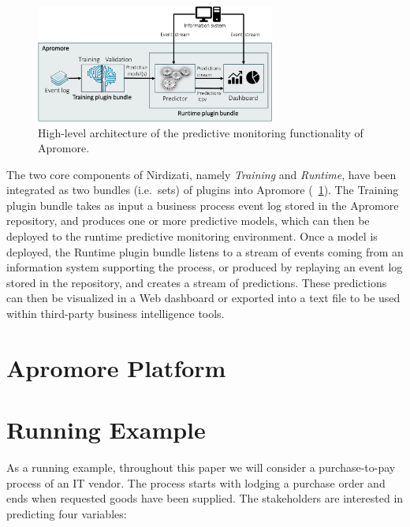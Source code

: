 \documentclass[runningheads,a4paper]{llncs}
\begin{document}
\begin{figure}[t]%
	\centering
	\includegraphics[width=0.7\textwidth]{img/nirdizati-overall.pdf}
	\caption{High-level architecture of the predictive monitoring functionality of Apromore.}
	\label{fig:nirdizati-overall}
\end{figure}

The two core components of Nirdizati, namely \textit{Training} and \textit{Runtime}, have been integrated as two bundles (i.e.\ sets) of plugins into Apromore (\figurename~\ref{fig:nirdizati-overall}). The Training plugin bundle takes as input a business process event log stored in the Apromore repository, and produces one or more predictive models, which can then be deployed to the runtime predictive monitoring environment. Once a model is deployed, the Runtime plugin bundle listens to a stream of events coming from an information system supporting the process, or produced by replaying an event log stored in the repository, and creates a stream of predictions. These predictions can then be visualized in a Web dashboard or exported into a text file to be used within third-party business intelligence tools.

\section{Apromore Platform}


\section{Running Example}
As a running example, throughout this paper we will consider a purchase-to-pay process of an IT vendor. The process starts with lodging a purchase order and ends when requested goods have been supplied. The stakeholders are interested in predicting four variables:
\end{document}
